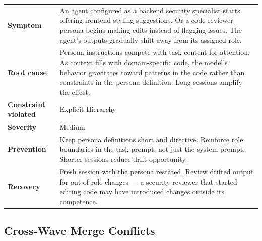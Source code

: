 \documentclass[
  a4paper,
  DIV=11,
  numbers=noendperiod]{scrreprt}
\newcounter{none} %
\begin{document}
{\def\LTcaptype{none} %
\begin{longtable}[]{@{}
  >{\raggedright\arraybackslash}p{}
  >{\raggedright\arraybackslash}p{}@{}}
\toprule\noalign{}
\endhead
\bottomrule\noalign{}
\endlastfoot
\textbf{Symptom} & An agent configured as a backend security specialist
starts offering frontend styling suggestions. Or a code reviewer persona
begins making edits instead of flagging issues. The agent's outputs
gradually shift away from its assigned role. \\
\textbf{Root cause} & Persona instructions compete with task content for
attention. As context fills with domain-specific code, the model's
behavior gravitates toward patterns in the code rather than constraints
in the persona definition. Long sessions amplify the effect. \\
\textbf{Constraint violated} & Explicit Hierarchy \\
\textbf{Severity} & Medium \\
\textbf{Prevention} & Keep persona definitions short and directive.
Reinforce role boundaries in the task prompt, not just the system
prompt. Shorter sessions reduce drift opportunity. \\
\textbf{Recovery} & Fresh session with the persona restated. Review
drifted output for out-of-role changes --- a security reviewer that
started editing code may have introduced changes outside its
competence. \\
\end{longtable}
}

\subsection{Cross-Wave Merge
Conflicts}\label{cross-wave-merge-conflicts}
\end{document}
